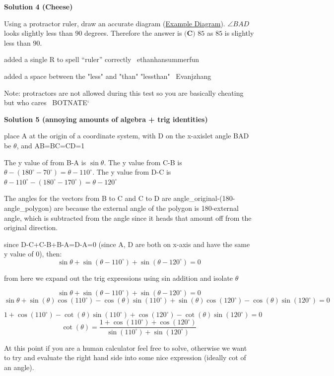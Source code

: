 \begin{enumerate}
 



\textbf{Solution 4 (Cheese)}

Using a protractor ruler, draw an accurate diagram (\href{https://i.imgur.com/YIafDgs.jpg/img}{Example Diagram}). $\angle BAD$ looks slightly less than $90$ degrees. Therefore the answer is $\boxed{\textbf{(C) } 85}$ as $85$ is slightly less than $90$.

 


 added a single R to spell “ruler” correctly ~ethanhansummerfun

 added a space between the "less" and "than" "lessthan" ~Evanjzhang

 Note: protractors are not allowed during this test so you are basically cheating but who cares ~BOTNATE`

 



\textbf{Solution 5 (annoying amounts of algebra + trig identities)}

place A at the origin of a coordinate system, with D on the x-axislet angle BAD be $\theta$, and AB=BC=CD=1

 The y value of from B-A is $\sin\theta$. The y value from C-B is $\theta-(180^\circ-70^\circ)=\theta-110^\circ$. The y value from D-C is $\theta-110^\circ-(180^\circ-170^\circ)=\theta-120^\circ$

 The angles for the vectors from B to C and C to D are angle\_original-(180-angle\_polygon) are because the external angle of the polygon is 180-external angle, which is subtracted from the angle since it heads that amount off from the original direction. 

 since D-C+C-B+B-A=D-A=0 (since A, D are both on x-axis and have the same y value of 0), then: 
 \[\sin\theta+\sin(\theta-110^\circ)+\sin(\theta-120^\circ)=0\]

 from here we expand out the trig expressions using sin addition and isolate $\theta$

 \[\sin\theta+\sin(\theta-110^\circ)+\sin(\theta-120^\circ)=0\]
 \[\sin\theta+\sin(\theta)\cos(110^\circ)-\cos(\theta)\sin(110^\circ)   +   \sin(\theta)\cos(120^\circ)-\cos(\theta)\sin(120^\circ)=0\]

 \[1+\cos(110^\circ)-\cot(\theta)\sin(110^\circ)+\cos(120^\circ)-\cot(\theta)\sin(120^\circ)=0\]
 \[\cot(\theta)=\frac{1+\cos(110^\circ)+\cos(120^\circ)}{\sin(110^\circ)+\sin(120^\circ)}\]

 At this point if you are a human calculator feel free to solve, otherwise we want to try and evaluate the right hand side into some nice expression (ideally cot of an angle).


\end{enumerate}
